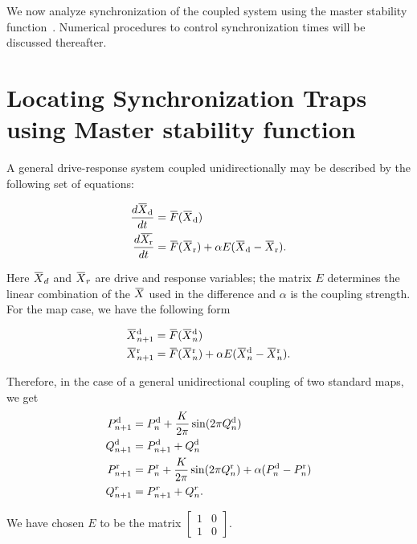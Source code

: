 \documentclass[reprint,amsmath,amssymb,aps,pre]{revtex4-1}
\newcommand{\overbar}[1]{\mkern 1.5mu\overline{\mkern-1.5mu#1\mkern-1.5mu}\mkern 1.5mu}
\begin{document}
We now analyze synchronization of the coupled system using the master stability function~\cite{Pecora1998}. Numerical procedures to control synchronization times will be discussed thereafter.  

\section{Locating Synchronization Traps using Master stability function}
\label{Master stability function}
A general drive-response system coupled unidirectionally may be described by the following set of equations:

\begin{align}
\frac{d\overbar{X}_\textnormal{d}}{dt} & = \overbar{F}(\overbar{X}_\textnormal{d}) \nonumber  \\
\frac{d\overbar{X_\textnormal{r}}}{dt} &= \overbar{F}(\overbar{X}_\textnormal{r}) + \alpha 
E(\overbar{X}_\textnormal{d}-\overbar{X}_\textnormal{r}).
\end{align}

\noindent Here $\overbar{X}_d$ and $\overbar{X}_r$ are drive and response 
variables; the matrix $E$ determines the linear combination of the 
$\overbar{X}$ used in the difference and $\alpha$ is the coupling strength. 
For the map case, we have the following form

\begin{align}
\overbar{X}^\textnormal{d}_{n+1} &= \overbar{F}(\overbar{X}^\textnormal{d}_{n}) \nonumber  \\
\overbar{X}^\textnormal{r}_{n+1} &= \overbar{F}(\overbar{X}^\textnormal{r}_{n}) + \alpha 
E(\overbar{X}^\textnormal{d}_{n}-\overbar{X}^\textnormal{r}_n).
\end{align}

Therefore, in the case of a general unidirectional coupling of two standard maps, we get
\begin{align}
P^\textnormal{d}_{n+1} &= P^\textnormal{d}_n + \frac{K}{2\pi}\sin(2\pi Q^\textnormal{d}_n) \nonumber\\
Q^\textnormal{d}_{n+1} &= P^\textnormal{d}_{n+1} + Q^\textnormal{d}_n \nonumber\\
P^\textnormal{r}_{n+1} &= P^\textnormal{r}_n + \frac{K}{2\pi}\sin (2\pi Q^\textnormal{r}_n) + \alpha(P^\textnormal{d}_n-P^\textnormal{r}_n) \nonumber \\
Q^r_{n+1} &= P^r_{n+1} + Q^r_n.
\label{equ:coupled}
\end{align}


We have chosen $E$ to be the matrix $\begin{bmatrix} 1 & 0 \\ 1 & 0 \end{bmatrix}$. 
\end{document}
